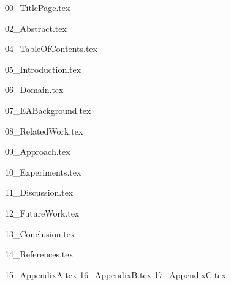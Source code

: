 \documentclass[version=last, pagesize=auto, paper=a4]{report}%
\numberwithin{equation}{section}
\begin{document}
	
\renewcommand{\baselinestretch}{1.0}\normalsize
{00_TitlePage.tex}
\renewcommand{\baselinestretch}{1.3}\normalsize


{02_Abstract.tex}


\renewcommand{\baselinestretch}{1.0}\normalsize
{04_TableOfContents.tex}
\renewcommand{\baselinestretch}{1.3}\normalsize

{05_Introduction.tex}

{06_Domain.tex}

{07_EABackground.tex}

{08_RelatedWork.tex}

{09_Approach.tex}

{10_Experiments.tex}

{11_Discussion.tex}

{12_FutureWork.tex}

{13_Conclusion.tex}

{14_References.tex}

\newpage
\begin{appendices}
    {15_AppendixA.tex}
    {16_AppendixB.tex}
    {17_AppendixC.tex}
\end{appendices}
\end{document}
